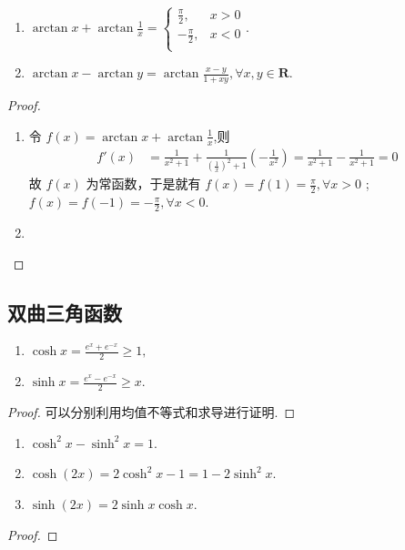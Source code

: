 \documentclass[../../main.tex]{subfiles}
\begin{document}
\begin{proposition}\label{proposition:arctan相关等式}
\begin{enumerate}[(1)]
\item $\arctan x+\arctan \frac{1}{x}=\begin{cases}
\frac{\pi}{2},&x>0\\
-\frac{\pi}{2},&x<0\\
\end{cases}$.

\item $\arctan x - \arctan y = \arctan \frac{x - y}{1 + xy},\forall x,y\in \mathbf{R}.$
\end{enumerate}
\end{proposition}
\begin{proof}
\begin{enumerate}
\item 令 \( f(x)=\arctan x+\arctan\frac{1}{x} \),则
\begin{align*}
f'(x)&=\frac{1}{x^2 + 1}+\frac{1}{(\frac{1}{x})^2 + 1}(-\frac{1}{x^2})=\frac{1}{x^2 + 1}-\frac{1}{x^2 + 1}=0
\end{align*}
故 \( f(x) \) 为常函数，于是就有 \( f(x)=f(1)=\frac{\pi}{2},\forall x>0 \) ;\( f(x)=f(-1)=-\frac{\pi}{2},\forall x<0 \).

\item 
\end{enumerate}
\end{proof}


\subsection{双曲三角函数}

\begin{proposition}
\begin{enumerate}[(1)]
\item $\cosh x=\frac{e^{x}+e^{-x}}{2}\geqslant1,$

\item $\sinh x=\frac{e^{x}-e^{-x}}{2}\geqslant x.$
\end{enumerate}
\end{proposition}
\begin{proof}
可以分别利用均值不等式和求导进行证明. 
\end{proof}

\begin{proposition}
\begin{enumerate}
\item $\cosh^2 x-\sinh^2 x=1$.

\item $\cosh(2x)=2\cosh^2 x-1=1-2\sinh^2 x$.

\item $\sinh(2x)=2\sinh x\cosh x$. 
\end{enumerate}
\end{proposition}
\begin{proof}

\end{proof}
\end{document}
